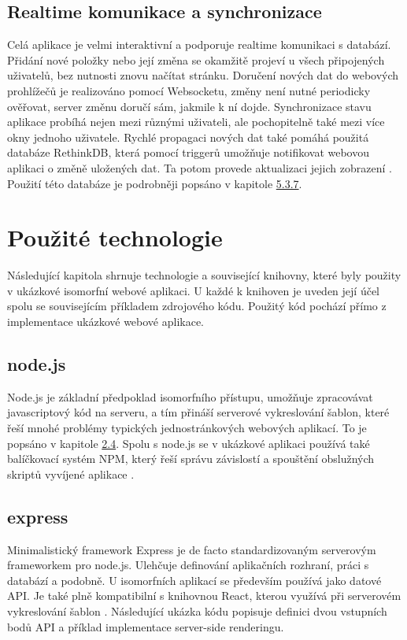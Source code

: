 \subsection{Realtime komunikace a synchronizace}
Celá aplikace je velmi interaktivní a podporuje realtime komunikaci s databází. Přidání nové položky nebo její změna se okamžitě projeví u všech připojených uživatelů, bez nutnosti znovu načítat stránku. Doručení nových dat do webových prohlížečů je realizováno pomocí Websocketu, změny není nutné periodicky ověřovat, server změnu doručí sám, jakmile k ní dojde. Synchronizace stavu aplikace probíhá nejen mezi různými uživateli, ale pochopitelně také mezi více okny jednoho uživatele. Rychlé propagaci nových dat také pomáhá použitá databáze RethinkDB, která pomocí triggerů umožňuje notifikovat webovou aplikaci o změně uložených dat. Ta potom provede aktualizaci jejich zobrazení \cite{rethinkdb}. Použití této databáze je podrobněji popsáno v kapitole \hyperref[sec:rethinkdb]{5.3.7}. 

\section{Použité technologie}
Následující kapitola shrnuje technologie a související knihovny, které byly použity v ukázkové isomorfní webové aplikaci. U každé k knihoven je uveden její účel spolu se souvisejícím příkladem zdrojového kódu. Použitý kód pochází přímo z implementace ukázkové webové aplikace.

\subsection{node.js}
Node.js je základní předpoklad isomorfního přístupu, umožňuje zpracovávat javascriptový kód na serveru, a tím přináší serverové vykreslování šablon, které řeší mnohé problémy typických jednostránkových webových aplikací. To je popsáno v kapitole \hyperref[sec:node_js]{2.4}. Spolu s node.js se v ukázkové aplikaci používá také balíčkovací systém NPM, který řeší správu závislostí a spouštění obslužných skriptů vyvíjené aplikace \cite{nodejs} \cite{npm}.

\subsection{express}
Minimalistický framework Express je de facto standardizovaným serverovým frameworkem pro node.js. Ulehčuje definování aplikačních rozhraní, práci s databází a podobně. U isomorfních aplikací se především používá jako datové API. Je také plně kompatibilní s knihovnou React, kterou využívá při serverovém vykreslování šablon \cite{express}. Následující ukázka kódu popisuje definici dvou vstupních bodů API a příklad implementace server-side renderingu.

